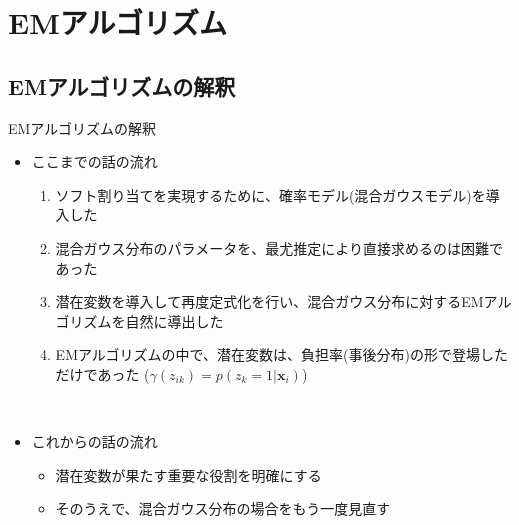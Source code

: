 \documentclass[dvipdfmx,notheorems,t]{beamer}
\begin{document}
\section{EMアルゴリズム}

\subsection{EMアルゴリズムの解釈}

\begin{frame}{EMアルゴリズムの解釈}

\begin{itemize}
	\item ここまでの話の流れ
	\begin{enumerate}
		\item \alert{ソフト割り当て}を実現するために、確率モデル(混合ガウスモデル)を導入した
		\newline
		\item 混合ガウス分布のパラメータを、最尤推定により直接求めるのは困難であった
		\newline
		\item \alert{潜在変数}を導入して再度定式化を行い、混合ガウス分布に対する\alert{EMアルゴリズム}を自然に導出した
		\newline
		\item EMアルゴリズムの中で、潜在変数は、\alert{負担率}(事後分布)の形で登場しただけであった ($\gamma(z_{ik}) = p(z_k = 1 | \bm{x}_i)$)
	\end{enumerate} \
	
	\item これからの話の流れ
	\begin{itemize}
		\item 潜在変数が果たす重要な役割を明確にする
		\item そのうえで、混合ガウス分布の場合をもう一度見直す
	\end{itemize}
\end{itemize}

\end{frame}
\end{document}
